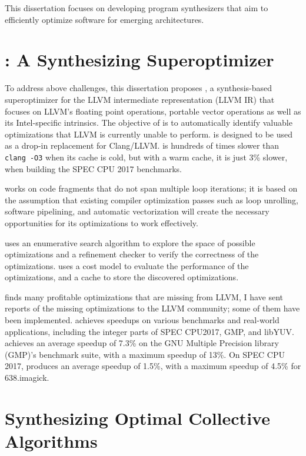 This dissertation focuses on developing program synthesizers that aim
to efficiently optimize software for emerging architectures.


\section{\minotaur: A Synthesizing Superoptimizer}

To address above challenges, this dissertation proposes \minotaur{}, a
synthesis-based superoptimizer for the LLVM intermediate
representation (LLVM IR) that focuses on LLVM's floating point
operations, portable vector operations as well as its Intel-specific
intrinsics.
%
The objective of \minotaur{} is to automatically identify valuable
optimizations that LLVM is currently unable to perform.
\minotaur{} is designed to be used as a drop-in replacement for Clang/LLVM.
\minotaur{} is hundreds of times slower than \texttt{clang -O3} when its
cache is cold, but with a warm cache, it is just 3\% slower, when
building the SPEC CPU 2017 benchmarks.

\minotaur{} works on code fragments that do not span multiple loop
iterations; it is based on the assumption that existing compiler
optimization passes such as loop unrolling, software pipelining, and
automatic vectorization will create the necessary opportunities for
its optimizations to work effectively.

\minotaur{} uses an enumerative search algorithm to explore the space of
possible optimizations and a refinement checker to verify the
correctness of the optimizations.
\minotaur{} uses a cost model to evaluate the performance of the
optimizations, and a cache to store the discovered optimizations.

\minotaur{} finds many profitable optimizations that are missing from
LLVM,
%
I have sent reports of the missing optimizations to the LLVM community;
some of them have been implemented.
%
\minotaur{} achieves speedups on various benchmarks and real-world
applications, including the integer parts of SPEC CPU2017, GMP, and
libYUV.
%
\minotaur{} achieves an average speedup of 7.3\% on the GNU Multiple
Precision library (GMP)'s benchmark suite, with a maximum speedup of
13\%. On SPEC CPU 2017, \minotaur{} produces an average speedup of 1.5\%,
with a maximum speedup of 4.5\% for 638.imagick.

\section{Synthesizing Optimal Collective Algorithms}

